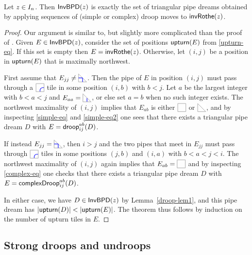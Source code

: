 \documentclass[10pt]{article}
\begin{document}
\begin{theorem}\label{droop-thm}
Let $z \in I_n $. Then $\mathsf{InvBPD}(z)$ is exactly 
the set of
triangular pipe dreams  obtained by applying sequences of 
(simple or complex) droop moves to $\mathsf{invRothe}(z)$.
\end{theorem}

\begin{proof}
Our argument is similar to, but slightly more complicated than the proof of \cite[Prop.~5.3]{LLS}.
Given $E \in \mathsf{InvBPD}(z)$, consider the set of positions $\mathsf{upturn}(E)$ from \eqref{upturn-eq}.
If this set is empty then $E =\mathsf{invRothe}(z)$.
Otherwise, let $(i,j) $ be a position in $\mathsf{upturn}(E)$ that is maximally northwest.

First assume that $E_{jj} \neq \PDIAG$. 
Then the pipe of $E$ in position $(i,j)$ must pass through a $\CTILE$ tile in some position $(i,b)$
with $b<j$. 
Let $a$ be the largest integer with $b<a<j$ and $E_{aa} = \CDIAG$,
or else set $a=b$ when no such integer exists.
The northwest maximality of $(i,j)$ implies that $E_{ab} $ is either $ \BTILE$ or $\BDIAG$, and by inspecting \eqref{simple-eq} and \eqref{simple-eq2} one sees that there exists a triangular pipe dream $D$ with $E = \mathsf{droop}^{ab}_{ij}(D)$.

If instead $E_{jj} = \PDIAG$, then $i>j$ and the two pipes that meet in $E_{jj}$
must pass through $\CTILE$ tiles in some positions $(j,b)$ and $(i,a)$
 with $b<a<j<i$.
 The northwest maximality of $(i,j)$ again implies that $E_{ab} = \BTILE$
 and by inspecting \eqref{complex-eq}  one checks that there exists a triangular pipe dream $D$ with $E = \mathsf{complexDroop}^{ab}_{ij}(D)$.
 
 In either case, we have $D \in \mathsf{InvBPD}(z)$ by Lemma~\ref{droop-lem1},
 and this pipe dream has $|\mathsf{upturn}(D)| < |\mathsf{upturn}(E)|$.
 The theorem thus follows by induction on the number of upturn tiles in
$E$.
\end{proof}


\subsection{Strong droops and undroops}
\end{document}
